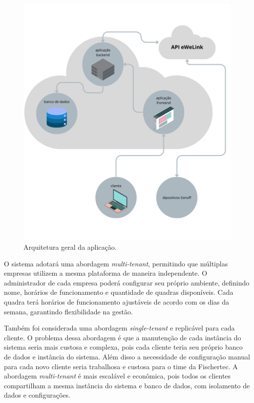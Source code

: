 \begin{figure}[htp]
	\caption{\label{fig:arquitetura_geral}Arquitetura geral da aplicação.}
	\begin{center}
	  \includegraphics[scale=0.5]{images/cap4/arquitetura_geral.png}
	\end{center}
\end{figure}

O sistema adotará uma abordagem \textit{multi-tenant}, permitindo que múltiplas empresas utilizem a mesma plataforma de maneira independente. O administrador de cada empresa poderá configurar seu próprio ambiente, definindo nome, horários de funcionamento e quantidade de quadras disponíveis. Cada quadra terá horários de funcionamento ajustáveis de acordo com os dias da semana, garantindo flexibilidade na gestão.

Também foi considerada uma abordagem \textit{single-tenant} e replicável para cada cliente. O problema dessa abordagem é que a manutenção de cada instância do sistema seria mais custosa e complexa, pois cada cliente teria seu próprio banco de dados e instância do sistema. Além disso a necessidade de configuração manual para cada novo cliente seria trabalhosa e custosa para o time da Fischertec. A abordagem \textit{multi-tenant} é mais escalável e econômica, pois todos os clientes compartilham a mesma instância do sistema e banco de dados, com isolamento de dados e configurações.

